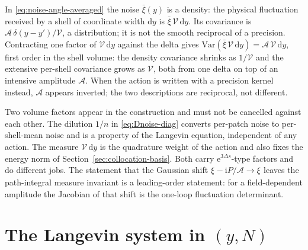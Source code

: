 \documentclass[a4paper,11pt]{article}
\newcommand{\semibold}[1]{{\fontseries{b}\selectfont{#1}}}
\renewcommand{\d}{\mathrm{d}}
\newcommand{\e}[1]{\mathrm{e}^{{#1}}}
\newcommand{\im}{\mathrm{i}}
\newenvironment{panel}{\begin{tcolorbox}[enhanced,breakable,colback=gray!10,colframe=gray!30]\small}{\end{tcolorbox}}
\newcommand{\Ny}{N}                          %
\newcommand{\field}{\phi}                    %
\newcommand{\noise}[1]{\xi_{#1}}             %
\newcommand{\yco}{y}                         %
\newcommand{\Deltas}{\Delta s}                %
\newcommand{\ncount}{n}                      %
\newcommand{\volel}{\mathcal{V}}             %
\begin{document}
\begin{panel}
\semibold{Noise density versus covariance, and two distinct volume factors.}
In \eqref{eq:noise-angle-averaged} the noise $\bar\xi(\yco)$ is a
density: the physical fluctuation received by a shell of coordinate width
$\d\yco$ is $\bar\xi\,\volel\,\d\yco$. Its covariance is
$\mathcal{A}\,\delta(\yco-\yco')/\volel$, a distribution; it is not the
smooth reciprocal of a precision. Contracting one factor of $\volel\,\d\yco$
against the delta gives
$\mathrm{Var}(\bar\xi\,\volel\,\d\yco) = \mathcal{A}\,\volel\,\d\yco$,
first order in the shell volume: the density covariance shrinks as
$1/\volel$ and the extensive per-shell covariance grows as $\volel$, both
from one delta on top of an intensive amplitude $\mathcal{A}$. When the
action is written with a precision kernel instead, $\mathcal{A}$ appears
inverted; the two descriptions are reciprocal, not different.

Two volume factors appear in the construction and must not be cancelled
against each other. The dilution $1/\ncount$ in \eqref{eq:Dnoise-diag}
converts per-patch noise to per-shell-mean noise and is a property of the
Langevin equation, independent of any action. The measure $\volel\,\d\yco$
is the quadrature weight of the action and also fixes the energy norm of
Section~\ref{sec:collocation-basis}. Both carry $\e{3\Deltas}$-type
factors and do different jobs. The statement that the Gaussian shift
$\noise{}-\im P/\mathcal{A}\to\noise{}$ leaves the path-integral measure
invariant is a leading-order statement: for a field-dependent amplitude the
Jacobian of that shift is the one-loop fluctuation determinant.
\end{panel}
\section{The Langevin system in $(\yco,\Ny)$}
\label{sec:langevin-y}
\end{document}

